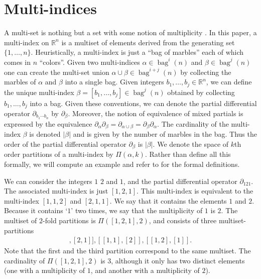 \documentclass[12pt]{amsart}
\newcommand{\R}{\ensuremath{\mathbb{R}}}
\DeclareMathOperator{\bag}{bag}
\begin{document}
\section{Multi-indices}
\label{sec:multi}
A multi-set is nothing but a set with some notion of multiplicity \cite{Blizard1989}.
In this paper, a multi-index on $\R^n$ is a multiset of elements derived from the generating set $\{1,\dots,n\}$.
Heuristically, a multi-index is just a ``bag of marbles'' each of which comes in $n$ ``colors''.
Given two multi-indices $\alpha \in \bag^i(n)$ and $\beta \in \bag^j(n)$ one can create the
multi-set union $\alpha \cup \beta \in \bag^{i+j}(n)$ by collecting the marbles of $\alpha$ and $\beta$ into a single bag.
Given integers $b_1,\dots,b_j \in \R^n$, we can define the unique multi-index $\beta = [b_1,\dots,b_j] \in \bag^j(n)$
obtained by collecting $b_1,\dots,b_j$ into a bag.
Given these conventions, we can denote the partial differential operator $\partial_{b_1 \cdots b_n }$ by $\partial_\beta$.
Moreover, the notion of equivalence of mixed partials is expressed by the equivalence 
$\partial_\alpha \partial_\beta = \partial_{\alpha \cup \beta} = \partial_\beta \partial_\alpha$.
The cardinality of the multi-index $\beta$ is denoted $|\beta|$ and is given by the number of marbles in the bag.
Thus the order of the partial differential operator $\partial_{\beta}$ is $|\beta|$.
We denote the space of $k$th order partitions of a multi-index by $\Pi(\alpha,k)$.
Rather than define all this formally, we will compute an example and refer to \cite{Jacobs2014b} for the formal definitions.

We can consider the integers $1$ $2$ and $1$, and the partial differential operator $\partial_{121}$.
The associated multi-index is just $[1,2,1]$.  This multi-index is equivalent to the multi-index $[1,1,2]$ and $[2,1,1]$.
We say that it contains the elements $1$ and $2$.
Because it contains `$1$' two times, we say that the multiplicity of $1$ is $2$.
The multiset of $2$-fold partitions is $\Pi( [1,2,1],2)$, and consists of three multiset-partitions
\begin{align*}
	[ [1] , [2,1] ] , [[1,1] , [2] ] , [ [1, 2] , [1] ].
\end{align*}
Note that the first and the third partition correspond to the same multiset.
The cardinality of $\Pi( [1,2,1],2)$ is $3$, although it only has two distinct elements (one with a multiplicity of $1$, and another with a multiplicity of $2$).
\end{document}
